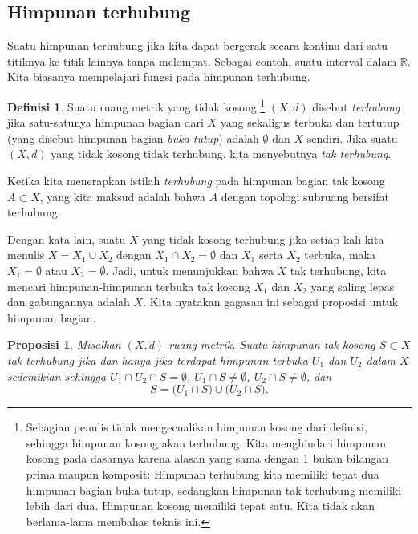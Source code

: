 \documentclass[12pt,openany]{book}
\newcommand{\R}{{\mathbb{R}}}
\newcommand{\myindex}[1]{#1\index{#1}}
\theoremstyle{plain}
\newtheorem{prop}[thm]{Proposisi}
\theoremstyle{remark}
\theoremstyle{definition}
\newtheorem{defn}[thm]{Definisi}
\theoremstyle{exercise}
\theoremstyle{example}
\begin{document}
\subsection{Himpunan terhubung}

Suatu himpunan terhubung jika kita dapat bergerak secara kontinu dari satu titiknya ke
titik lainnya tanpa melompat. Sebagai contoh, suatu interval dalam $\R$.
Kita biasanya mempelajari fungsi pada himpunan terhubung.

\begin{defn}
Suatu ruang metrik yang tidak kosong%
\footnote{Sebagian penulis tidak mengecualikan himpunan kosong dari definisi,
sehingga himpunan kosong akan terhubung.
Kita menghindari himpunan kosong pada dasarnya karena alasan yang sama dengan
$1$ bukan bilangan prima maupun komposit: Himpunan terhubung kita memiliki tepat
dua himpunan bagian buka-tutup, sedangkan himpunan tak terhubung memiliki lebih dari dua. Himpunan kosong
memiliki tepat satu. Kita tidak akan berlama-lama membahas teknis ini.}
$(X,d)$ disebut \emph{\myindex{terhubung}} jika satu-satunya
himpunan bagian dari $X$ yang sekaligus terbuka dan tertutup (yang disebut himpunan bagian
\emph{\myindex{buka-tutup}}) adalah $\emptyset$ dan $X$ sendiri.
Jika suatu $(X,d)$ yang tidak kosong tidak terhubung, kita menyebutnya
\emph{\myindex{tak terhubung}}.

Ketika kita menerapkan istilah \emph{terhubung} pada himpunan bagian tak kosong $A \subset X$, yang
kita maksud adalah bahwa $A$ dengan topologi subruang bersifat terhubung.
\end{defn}

Dengan kata lain, suatu $X$ yang tidak kosong terhubung jika setiap kali kita menulis
$X = X_1 \cup X_2$ dengan $X_1 \cap X_2 = \emptyset$ dan $X_1$ serta $X_2$
terbuka, maka $X_1 = \emptyset$ atau $X_2 = \emptyset$.
Jadi, untuk menunjukkan bahwa $X$ tak terhubung, kita mencari himpunan-himpunan terbuka tak kosong
$X_1$ dan $X_2$ yang saling lepas dan
gabungannya adalah $X$.
Kita nyatakan gagasan ini sebagai proposisi untuk himpunan bagian.

\begin{prop}
Misalkan $(X,d)$ ruang metrik.
Suatu himpunan tak kosong $S \subset X$ tak terhubung jika dan hanya jika
terdapat himpunan terbuka $U_1$ dan
$U_2$ dalam $X$ sedemikian sehingga $U_1 \cap U_2 \cap S = \emptyset$,
$U_1 \cap S \neq \emptyset$,
$U_2 \cap S \neq \emptyset$, dan
\begin{equation*}
S =
\bigl( U_1 \cap S \bigr)
\cup
\bigl( U_2 \cap S \bigr) .
\end{equation*}
\end{prop}
\end{document}
